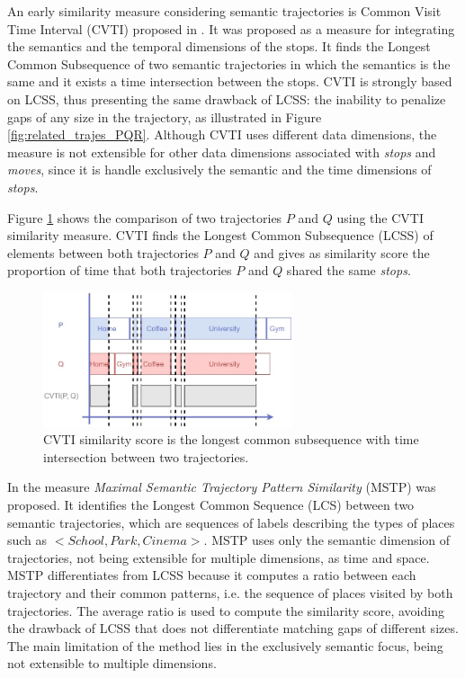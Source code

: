 An early similarity measure considering semantic trajectories is Common Visit Time Interval (CVTI) proposed in \cite{Kang:2009:SMT:1529282.1529580}. It was proposed as a measure for integrating the semantics {and the temporal dimensions of the stops}. It finds the Longest Common Subsequence of two semantic trajectories in {which the semantics is the same and it exists a time intersection between the stops}.
CVTI is strongly based on LCSS, thus presenting the same drawback of LCSS: the inability to penalize gaps of any size in the trajectory, as illustrated in Figure \ref{fig:related_trajes_PQR}. Although CVTI uses different data dimensions, the measure is not extensible for other data dimensions associated with \emph{stops} and \emph{moves}{, since it is handle exclusively the semantic and the time dimensions of \emph{stops}}.

Figure \ref{fig:related_trajes_CVTI} shows the comparison of two trajectories $P$ and $Q$ using the CVTI similarity measure. CVTI finds the Longest Common Subsequence (LCSS) of elements between both trajectories $P$ and $Q$ and gives as similarity score the proportion of time that both trajectories $P$ and $Q$ shared the same \emph{stops}.

\begin{figure}[h]
\centering
\includegraphics[width=0.65\textwidth]{Related_Works/Semantic_Trajectories_(CVTI).jpg}
\caption{\label{fig:related_trajes_CVTI}CVTI similarity score is the longest common subsequence with time intersection between two trajectories.}
\end{figure}

In \cite{Ying:2010:MUS:1867699.1867703} the measure \emph{Maximal Semantic Trajectory Pattern Similarity} (MSTP) was proposed. It identifies the Longest Common Sequence (LCS) between two semantic trajectories, which are sequences of labels describing the types of places such as $<School, Park, Cinema>$. {MSTP uses only the semantic dimension of trajectories, not being extensible for multiple dimensions, as time and space.} MSTP differentiates from LCSS because it computes a ratio between each trajectory and their common patterns, i.e. the sequence of places visited by both trajectories. The average ratio is used to compute the similarity score, avoiding the drawback of LCSS that does not differentiate matching gaps of different sizes. {The main limitation of the method lies in the exclusively semantic focus, being not extensible to multiple dimensions.}

